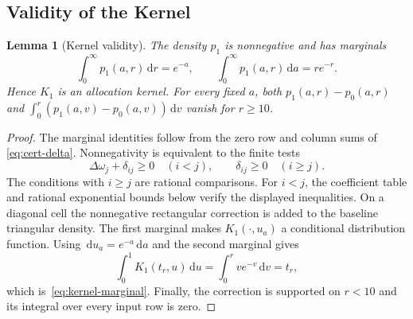 \documentclass[11pt]{article}
\newtheorem{lemma}[theorem]{Lemma}
\theoremstyle{definition}
\theoremstyle{remark}
\newcommand{\dd}{\,\mathrm d}
\begin{document}
\subsection{Validity of the Kernel}
\label{app:cert-validity}\label{app:cert-coefficients}

\begin{lemma}[Kernel validity]\label{lem:cert-kernel-valid}
The density $p_1$ is nonnegative and has marginals
\begin{equation}\label{eq:cert-marginals}
 \int_0^\infty p_1(a,r)\dd r=e^{-a},\qquad
 \int_0^\infty p_1(a,r)\dd a=re^{-r}.
\end{equation}
Hence $K_1$ is an allocation kernel.  For every fixed $a$, both
$p_1(a,r)-p_0(a,r)$ and
$\int_0^r(p_1(a,v)-p_0(a,v))\dd v$ vanish for $r\ge10$.
\end{lemma}
\begin{proof}
The marginal identities follow from the zero row and column sums of
\eqref{eq:cert-delta}.  Nonnegativity is equivalent to the finite tests
\[
 \Delta\omega_j+\delta_{ij}\ge0\quad(i<j),\qquad
 \delta_{ij}\ge0\quad(i\ge j).
\]
The conditions with $i\ge j$ are rational comparisons.  For $i<j$,
the coefficient table and rational exponential bounds below verify
the displayed inequalities.
On a diagonal cell the nonnegative rectangular correction is added to
the baseline triangular density.
The first marginal makes $K_1(\cdot,u_a)$ a conditional distribution function.
Using $\dd u_a=e^{-a}\dd a$ and the second marginal gives
\[
 \int_0^1K_1(t_r,u)\dd u
 =\int_0^r ve^{-v}\dd v=t_r,
\]
which is~\eqref{eq:kernel-marginal}.
Finally, the correction is supported on
$r<10$ and its integral over every input row is zero.
\end{proof}
\end{document}
